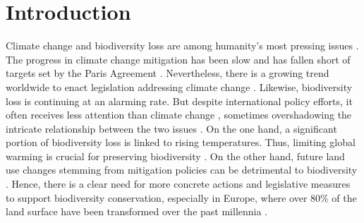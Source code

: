 \documentclass[]{article}
\begin{document}

\section{Introduction}

Climate change and biodiversity loss are among humanity's most pressing issues \parencite{IPCCsynthesisAR62023, IPBES2019}. The progress in climate change mitigation has been slow and has fallen short of targets set by the Paris Agreement \parencite{UN2023}. Nevertheless, there is a growing trend worldwide to enact legislation addressing climate change \parencite{Eskander2020}. Likewise, biodiversity loss is continuing at an alarming rate. But despite international policy efforts, it often receives less attention than climate change \parencite{Barbier2018}, sometimes overshadowing the intricate relationship between the two issues \parencite{Sage2020, Portner2023}. On the one hand, a significant portion of biodiversity loss is linked to rising temperatures. Thus, limiting global warming is crucial for preserving biodiversity \parencite{Ohashi2019, Warren2018}.
On the other hand, future land use changes stemming from mitigation policies can be detrimental to biodiversity \parencite{Ohashi2019, Hof2018}.
Hence, there is a clear need for more concrete actions and legislative measures to support biodiversity conservation, especially in Europe, where over 80\% of the land surface have been transformed over the past millennia \parencite{EEALandUse2023, Ellis2021}.
\end{document}
